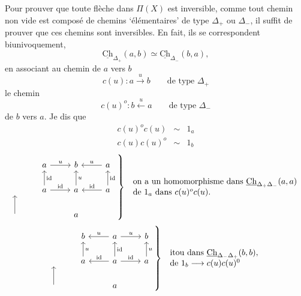 \documentclass[11pt]{article}
\newcommand{\printedpage}[1]{\marginpar{\footnotesize p.~#1}}
\newcommand{\msp}[1]{\marginpar{\vspace*{10pt}\footnotesize [#1]}}
\newcommand{\Ch}{\underline{\mathrm{Ch}}}
\begin{document}
\printedpage{42}
\msp{page 63}
Pour prouver que toute flèche dans $\Pi(X)$ est inversible, comme tout chemin non vide est composé de chemins `élémentaires' de type $\Delta_+$ ou $\Delta_-$, il suffit de prouver que ces chemins sont inversibles. En fait, ils se correspondent biunivoquement,
\[
\Ch_{\Delta_+}(a,b) \simeq \Ch_{\Delta_-}(b,a),
\]
en associant au chemin de $a$ vers $b$
\[
c(u) : a \xrightarrow{u} b \qquad \text{de type } \Delta_+
\]
le chemin
\[
c(u)^o : b \xleftarrow{u} a \qquad \text{de type } \Delta_-
\]
de $b$ vers $a$. Je dis que
\[
\begin{array}{rcl}
c(u)^o c(u) & \sim & 1_a\\
c(u) c(u)^o & \sim & 1_b
\end{array}
\]
\[
\left.
\begin{tikzcd}
 & a \arrow[r, "u"] & b & a \arrow[l, "u"'] \\
 {} & a \arrow[u, "\mathrm{id}"'] \arrow[r, "\mathrm{id}"] & a \arrow[u, "u"'] & a \arrow[u, "\mathrm{id}"'] \arrow[l, "\mathrm{id}"'] \\
 {} \arrow[u] & & a &
\end{tikzcd}
\right\}\
\begin{array}{l}
\text{on a un homomorphisme dans } \Ch_{\Delta_+\Delta_-}(a,a)\\
\text{de } 1_a \text{ dans } c(u)^o c(u).
\end{array}
\]
\[
\left.
\begin{tikzcd}
 & b & a \arrow[l, "u"'] \arrow[r, "u"] & b \\
 {} & a \arrow[u, "u"'] & a \arrow[u, "\mathrm{id}"'] \arrow[l, "\mathrm{id}"'] \arrow[r, "\mathrm{id}"] & a \arrow[u, "u"'] \\
 {} \arrow[u] & & a &
\end{tikzcd}
\right\}\
\begin{array}{l}
\text{itou dans } \Ch_{\Delta_-\Delta_+}(b,b),\\
\text{de } 1_b \longrightarrow c(u)c(u)^0 %
\end{array}
\]
\end{document}
